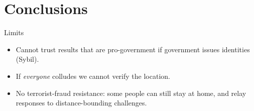 \section{Conclusions}

\begin{frame}
  \begin{alertblock}{Limits}
    \begin{itemize}
      \item Cannot trust results that are pro-government if government issues 
        identities (Sybil).

        \pause{}

      \item If \emph{everyone} colludes we cannot verify the location.

        \pause{}

      \item No terrorist-fraud resistance: some people can still stay at home, 
        and relay responses to distance-bounding challenges.
    \end{itemize}
  \end{alertblock}
\end{frame}
